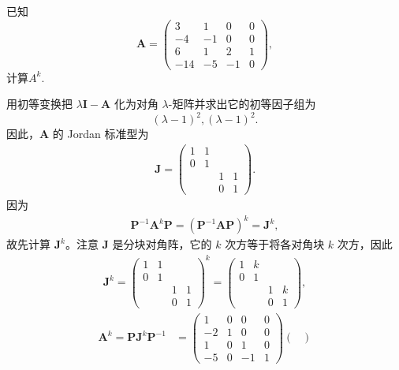 \documentclass[../../main.tex]{subfiles}%
\begin{document}
\begin{example}
已知
\[
\boldsymbol{A} = 
\begin{pmatrix}
3 & 1 & 0 & 0 \\
-4 & -1 & 0 & 0 \\
6 & 1 & 2 & 1 \\
-14 & -5 & -1 & 0
\end{pmatrix},
\] 
计算$A^k.$
\end{example}
\begin{solution}
用初等变换把 $\lambda\boldsymbol{I} - \boldsymbol{A}$ 化为对角 $\lambda$-矩阵并求出它的初等因子组为
\[
(\lambda - 1)^2, (\lambda - 1)^2.
\]
因此，$\boldsymbol{A}$ 的 Jordan 标准型为
\begin{align*}
\boldsymbol{J} = 
\begin{pmatrix}
1 & 1 & & \\
0 & 1 & & \\
 & & 1 & 1 \\
 & & 0 & 1
\end{pmatrix}.
\end{align*} 
因为
\begin{align*}
\boldsymbol{P}^{-1}\boldsymbol{A}^k\boldsymbol{P} = (\boldsymbol{P}^{-1}\boldsymbol{AP})^k = \boldsymbol{J}^k,
\end{align*}
故先计算 $\boldsymbol{J}^k$。注意 $\boldsymbol{J}$ 是分块对角阵，它的 $k$ 次方等于将各对角块 $k$ 次方，因此
\begin{align*}
\boldsymbol{J}^k = 
\begin{pmatrix}
1 & 1 & & \\
0 & 1 & & \\
    & & 1 & 1 \\
    & & 0 & 1
\end{pmatrix}^k
=
\begin{pmatrix}
1 & k & & \\
0 & 1 & & \\
    & & 1 & k \\
    & & 0 & 1
\end{pmatrix},
\end{align*}
\begin{align*}
\boldsymbol{A}^k = \boldsymbol{PJ}^k\boldsymbol{P}^{-1} 
&=
\begin{pmatrix}
1 & 0 & 0 & 0 \\
-2 & 1 & 0 & 0 \\
1 & 0 & 1 & 0 \\
-5 & 0 & -1 & 1
\end{pmatrix}
\begin{pmatrix}

\end{pmatrix}
\end{align*}
\end{solution}
\end{document}
